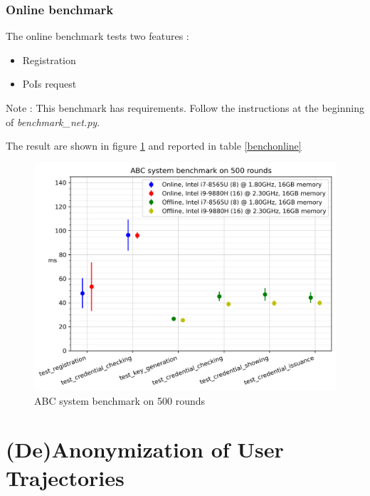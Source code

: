 \documentclass[10pt,conference,compsocconf]{IEEEtran}
\begin{document}
\subsubsection{Online benchmark}
The online benchmark tests two features :
\begin{itemize}
    \item Registration
    \item PoIs request
\end{itemize}
Note : This benchmark has requirements. Follow the instructions at the beginning of \textit{benchmark\_net.py}.

The result are shown in figure \ref{bench_fig}
and reported in table \ref{benchonline}
\begin{figure}
    \includegraphics[width=\columnwidth]{ABC_system_benchmark_on_500_rounds.png}
    \caption{ABC system benchmark on 500 rounds}
    \label{bench_fig}
\end{figure}


\section{(De)Anonymization of User Trajectories}
\end{document}
